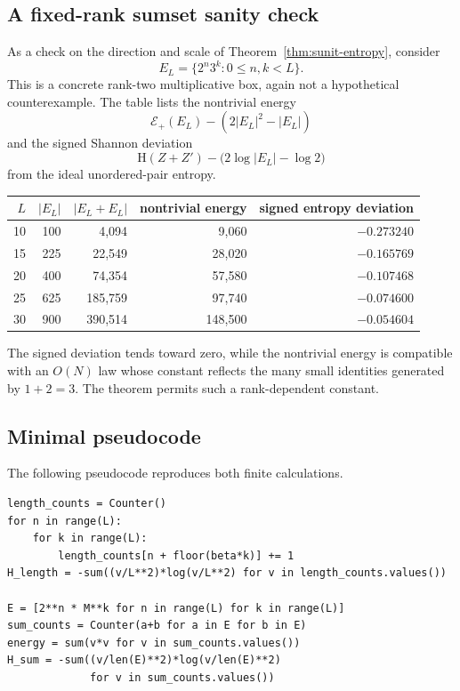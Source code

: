 \documentclass[11pt,oneside]{article}
\theoremstyle{definition}
\theoremstyle{remark}
\newcommand{\HH}{\mathrm{H}}
\newcommand{\abs}[1]{\left|#1\right|}
\begin{document}
\subsection{A fixed-rank sumset sanity check}

As a check on the direction and scale of Theorem~\ref{thm:sunit-entropy}, consider
\[
 E_L=\{2^n3^k:0\leq n,k<L\}.
\]
This is a concrete rank-two multiplicative box, again not a hypothetical counterexample.  The table lists the nontrivial energy
\[
 \mathcal E_+(E_L)-(2\abs{E_L}^2-\abs{E_L})
\]
and the signed Shannon deviation
\[
 \HH(Z+Z')-\bigl(2\log\abs{E_L}-\log2\bigr)
\]
from the ideal unordered-pair entropy.

\begin{center}
\begin{tabular}{rrrrr}
\toprule
\(L\) & \(\abs{E_L}\) & \(\abs{E_L+E_L}\) & nontrivial energy & signed entropy deviation\\
\midrule
10 & 100 & 4,094 & 9,060 & \(-0.273240\)\\
15 & 225 & 22,549 & 28,020 & \(-0.165769\)\\
20 & 400 & 74,354 & 57,580 & \(-0.107468\)\\
25 & 625 & 185,759 & 97,740 & \(-0.074600\)\\
30 & 900 & 390,514 & 148,500 & \(-0.054604\)\\
\bottomrule
\end{tabular}
\end{center}

The signed deviation tends toward zero, while the nontrivial energy is compatible with an \(O(N)\) law whose constant reflects the many small identities generated by \(1+2=3\).  The theorem permits such a rank-dependent constant.

\subsection{Minimal pseudocode}

The following pseudocode reproduces both finite calculations.
\begin{verbatim}
length_counts = Counter()
for n in range(L):
    for k in range(L):
        length_counts[n + floor(beta*k)] += 1
H_length = -sum((v/L**2)*log(v/L**2) for v in length_counts.values())

E = [2**n * M**k for n in range(L) for k in range(L)]
sum_counts = Counter(a+b for a in E for b in E)
energy = sum(v*v for v in sum_counts.values())
H_sum = -sum((v/len(E)**2)*log(v/len(E)**2)
             for v in sum_counts.values())
\end{verbatim}
\end{document}
